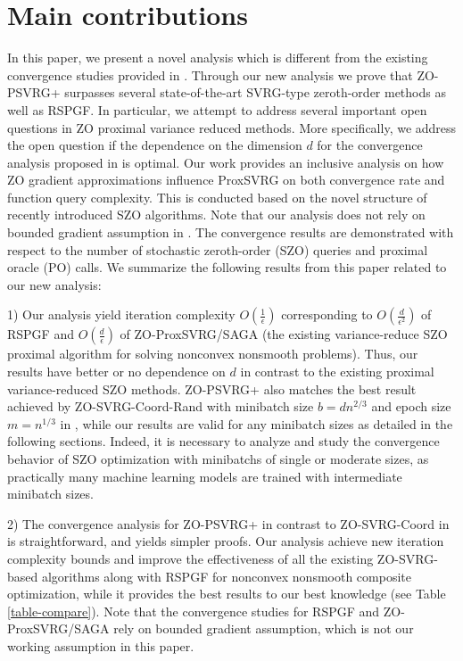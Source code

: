 \section{Main contributions}
In this paper, we present a novel analysis which is different from the existing convergence studies provided in \cite{liu2018zeroth,ji2019improved}. Through  our new analysis we prove that ZO-PSVRG+  surpasses several state-of-the-art SVRG-type zeroth-order methods as well as RSPGF. In particular, we attempt to address several important open questions in ZO proximal variance reduced methods. More specifically, we address the open question if the dependence on the dimension $d$ for the convergence analysis proposed in \cite{liu2018zeroth} is optimal. Our work provides an inclusive analysis on how ZO gradient approximations influence ProxSVRG on both  convergence rate and function query complexity. This
is conducted based on the novel structure of recently introduced SZO algorithms.
Note that our analysis does not rely on bounded gradient assumption in \cite{ghadimi2016accelerated,huang2019faster}.
The convergence results are demonstrated with respect to the number of stochastic zeroth-order (SZO) queries and proximal oracle (PO) calls. 
We summarize the following results from this paper related to our new analysis:

1) Our analysis yield iteration complexity $O(\frac{1}{{\epsilon}})$ corresponding to $O(\frac{d}{\epsilon^2})$ of RSPGF \cite{ghadimi2016accelerated}  and $O(\frac{d}{\epsilon})$ of ZO-ProxSVRG/SAGA  \cite{huang2019faster} (the existing variance-reduce SZO proximal algorithm for solving nonconvex nonsmooth problems).  
Thus, our results have better or no dependence on
$d$ in contrast to the existing proximal variance-reduced SZO methods. ZO-PSVRG+ also matches the best result achieved by ZO-SVRG-Coord-Rand with minibatch size $b = d n^{2/3}$ and epoch size $m = n^{1/3}$ in \cite{ji2019improved}, while our results are valid for any minibatch sizes as detailed in the following sections.  
Indeed, it is necessary to analyze and study the convergence behavior of SZO optimization with minibatchs of single or moderate sizes, as practically many machine learning models are trained with intermediate minibatch sizes.


2) The convergence analysis for ZO-PSVRG+ in contrast to  ZO-SVRG-Coord in \cite{liu2018zeroth,ji2019improved} is straightforward, and yields simpler proofs. Our analysis achieve new iteration complexity bounds and improve the effectiveness of  all the existing ZO-SVRG-based algorithms along with RSPGF for nonconvex nonsmooth composite optimization, while it provides the best results to our best knowledge (see Table \ref{table-compare}). Note that the convergence studies for RSPGF and ZO-ProxSVRG/SAGA rely on bounded gradient assumption, which is not our working assumption in this paper.


